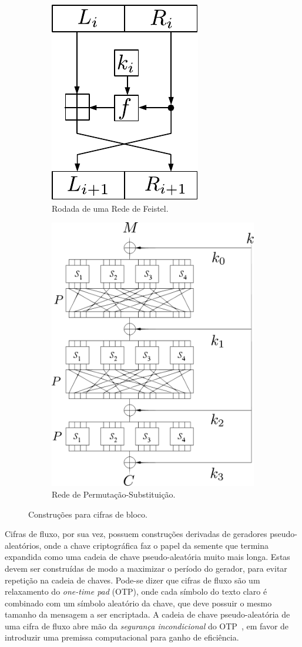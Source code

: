 \begin{figure}[htbp]
\centering
\begin{subfigure}{.5\textwidth}
  \centering
  \includegraphics[width=.4\linewidth]{figures/feistel.pdf}
  \caption{Rodada de uma Rede de Feistel.}
  \label{fig:feistel}
\end{subfigure}%
\begin{subfigure}{.5\textwidth}
  \centering
  \includegraphics[width=.7\linewidth]{figures/spn.pdf}
  \caption{Rede de Permutação-Substituição.}
  \label{fig:spn}
\end{subfigure}
\caption{Construções para cifras de bloco.}
\label{fig:bloco}
\end{figure}

Cifras de fluxo, por sua vez, possuem construções derivadas de geradores pseudo-aleatórios, onde a chave criptográfica faz o papel da semente que termina expandida como uma cadeia de chave pseudo-aleatória muito mais longa. Estas devem ser construídas de modo a maximizar o período do gerador, para evitar repetição na cadeia de chaves. Pode-se dizer que cifras de fluxo são um relaxamento do \emph{one-time pad} (OTP), onde cada símbolo do texto claro é combinado com um símbolo aleatório da chave, que deve possuir o mesmo tamanho da mensagem a ser encriptada. A cadeia de chave pseudo-aleatória de uma cifra de fluxo abre mão da \emph{segurança incondicional} do OTP~\cite{Shannon49}, em favor de introduzir uma premissa computacional para ganho de eficiência.


